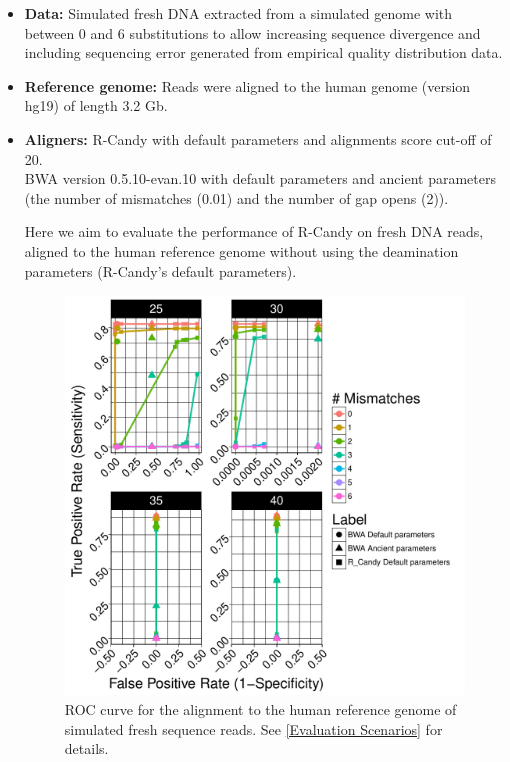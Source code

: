 \documentclass[11pt,a4paper]{report}
\begin{document}
 \begin{itemize}
 
   \item \textbf{Data:} Simulated fresh DNA extracted from a simulated genome 
   with between 0 and 6 substitutions to allow increasing sequence divergence
   and including sequencing error generated from empirical quality distribution
   data.
   
   \item \textbf{Reference genome:} Reads were aligned to the human genome 
   (version hg19) of length 3.2 Gb.

    \item \textbf{Aligners:} 
R-Candy with default parameters and alignments score cut-off of 20. \\
BWA version 0.5.10-evan.10 with default parameters and ancient parameters 
\cite{green2010draft} (the number of mismatches 
(0.01) and the number of gap opens (2)).


Here we aim to evaluate the performance of R-Candy on fresh DNA reads, 
aligned to the human reference genome without using the deamination parameters  
(R-Candy's default parameters).


\begin{figure}[H]
\centering
\includegraphics[width=12cm]{pictures/bROC_DS6_emp.pdf}
\caption{ 
ROC curve for the alignment to the human reference genome of simulated 
fresh sequence reads. See \ref{Evaluation Scenarios} for details.
}
\label{DS6_emp}
\end{figure}
  \end{itemize}
\end{document}
